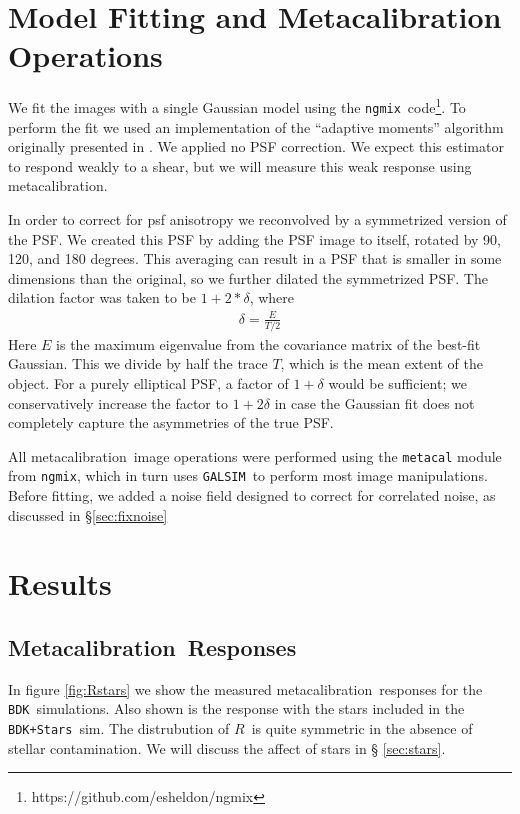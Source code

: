 \documentclass[a4paper,fleqn,usenatbib]{mnras}
\newcommand{\mcal}{metacalibration}
\newcommand{\Mcal}{Metacalibration}
\newcommand{\mcalR}{$R$}
\newcommand{\ngmix}{\texttt{ngmix}}
\newcommand{\bdsim}{\texttt{BDK}}
\newcommand{\bdstar}{\texttt{BDK+Stars}}
\newcommand{\galsim}{\texttt{GALSIM}}
\begin{document}
\section{Model Fitting and Metacalibration Operations} \label{sec:modelfit}

We fit the images with a single Gaussian model using the \ngmix\
code\footnote{https://github.com/esheldon/ngmix}.  To perform the fit we used an
implementation of the ``adaptive moments'' algorithm originally presented in
\cite{bj02}.   We applied no PSF correction.  We expect this estimator to
respond weakly to a shear, but we will measure this weak response using \mcal.

In order to correct for psf anisotropy  we reconvolved by a symmetrized version
of the PSF. We created this PSF by adding the PSF image to itself, rotated by
90, 120, and 180 degrees.  This averaging can result in a PSF that is smaller
in some dimensions than the original, so we further dilated the symmetrized
PSF.  The dilation factor was taken to be $1+2*\delta$, where
\begin{align}
    \delta = \frac{E}{T/2}
\end{align}
Here $E$ is the maximum eigenvalue from the covariance matrix of the best-fit
Gaussian. This we divide by half the trace $T$, which is the mean extent of the
object.  For a purely elliptical PSF, a factor of $1+\delta$ would be
sufficient; we conservatively increase the factor to $1+2\delta$ in case the
Gaussian fit does not completely capture the asymmetries of the true PSF.

All \mcal\ image operations were performed using the \texttt{metacal} module
from \ngmix, which in turn uses \galsim\ to perform most image manipulations.
Before fitting, we added a noise field designed to correct for correlated
noise, as discussed in \S \ref{sec:fixnoise}


\section{Results} \label{sec:results}


\subsection{\Mcal\ Responses}

In figure \ref{fig:Rstars} we show the measured \mcal\ responses for the
\bdsim\  simulations.  Also shown is the response with the stars included in
the \bdstar\ sim.  The distrubution of \mcalR\ is quite symmetric in the
absence of stellar contamination.  We will discuss the affect of stars in \S
\ref{sec:stars}.
\end{document}
